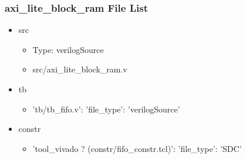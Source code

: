 \subsubsection{axi\_lite\_block\_ram File List}
\begin{itemize}
\item src
	\begin{itemize}
	\item[$\space$] Type: verilogSource
	\item src/axi\_lite\_block\_ram.v
	\end{itemize}
\item tb
	\begin{itemize}
	\item {'tb/tb\_fifo.v': {'file\_type': 'verilogSource'}}
	\end{itemize}
\item constr
	\begin{itemize}
	\item {'tool\_vivado ? (constr/fifo\_constr.tcl)': {'file\_type': 'SDC'}}
	\end{itemize}
\end{itemize}
